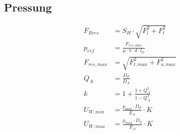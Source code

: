 \subsection{Pressung}

\begin{align*}
    F_{R res} &= S_H \cdot \sqrt{F_l^2 + F_t^2}\\
    p_{erf} &= \frac{F_{res,max}}{\mu \cdot \pi \cdot d \cdot l_{tr}}\\
    F_{res,max} &= \sqrt{F_{t,max}^2 + F_{a,max}^2}\\
    Q_A &= \frac{D_F}{D_A}\\
    k &= 1 + \frac{1+Q_A^2}{1-Q_A^2}\\
    U_{W,min} &= \frac{p_{min} \cdot D_F}{E_A} \cdot K\\
    U_{W,max} &= \frac{p_{max} \cdot D_F}{E_A} \cdot K
\end{align*}
